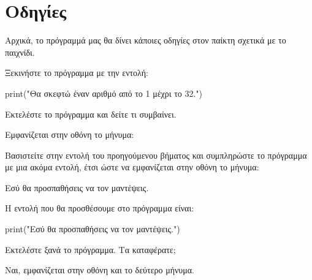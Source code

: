 \documentclass[a4paper,11pt,oneside]{book}
\begin{document}
\worksheettrue
\solutionstrue
{}

\section{Οδηγίες}

Αρχικά, το πρόγραμμά μας θα δίνει κάποιες οδηγίες στον παίκτη σχετικά με το παιχνίδι.

\begin{step}
Ξεκινήστε το πρόγραμμα με την εντολή:

\begin{pynew}
print("Θα σκεφτώ έναν αριθμό από το 1 μέχρι το 32.")
\end{pynew}

Εκτελέστε το πρόγραμμα και δείτε τι συμβαίνει.

\begin{answer}
Εμφανίζεται στην οθόνη το μήνυμα: 

\end{answer}
\end{step}

\begin{step}
Βασιστείτε στην εντολή του προηγούμενου βήματος και συμπληρώστε το πρόγραμμα με μια ακόμα εντολή, έτσι ώστε να εμφανίζεται στην οθόνη το μήνυμα:

\marginnote[16pt]{\iconcomputer}
\begin{pyterm}
Εσύ θα προσπαθήσεις να τον μαντέψεις.
\end{pyterm}

\begin{answer}
Η εντολή που θα προσθέσουμε στο πρόγραμμα είναι:
	
\begin{pynew}
print("Εσύ θα προσπαθήσεις να τον μαντέψεις.")	
\end{pynew}
\end{answer}

Εκτελέστε ξανά το πρόγραμμα. Τα καταφέρατε;

\begin{answer}
Ναι, εμφανίζεται στην οθόνη και το δεύτερο μήνυμα.
\end{answer}
\end{step}
\end{document}
